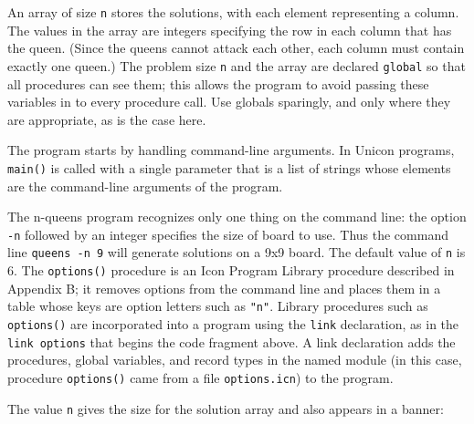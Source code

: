 An array of size \texttt{n} stores the solutions, with each element
representing a column. The values in the array are integers specifying
the row in each column that has the queen. (Since the queens cannot
attack each other, each column must contain exactly one queen.) The
problem size \texttt{n} and the array are declared \texttt{global} so
that all procedures can see them; this allows the program to avoid
passing these variables in to every procedure call. Use globals
sparingly, and only where they are appropriate, as is the case here.


The program starts by handling command-line arguments. In Unicon
programs, \texttt{main()} is called with a single parameter that is a
list of strings whose elements are the command-line arguments of the
program.

The n-queens program recognizes only one thing on the command line: the
option \texttt{{}-n} followed by an integer specifies the size of board
to use. Thus the command line \texttt{queens -n 9} will generate
solutions on a 9x9 board. The default value of \texttt{n} is 6. The
\texttt{options()} procedure is an Icon Program
Library procedure described in Appendix B; it removes options from the
command line and places them in a table whose keys are option letters
such as \texttt{"n"}. Library procedures
such as \texttt{options()} are incorporated into a program using the
\texttt{link} declaration, as in the \texttt{link options}
that begins the code fragment above. A link declaration adds the
procedures, global variables, and record types in the named module (in
this case, procedure \texttt{options()} came from a file
\texttt{options.icn}) to the program.


The value \texttt{n} gives the size for the solution array and also
appears in a banner:


